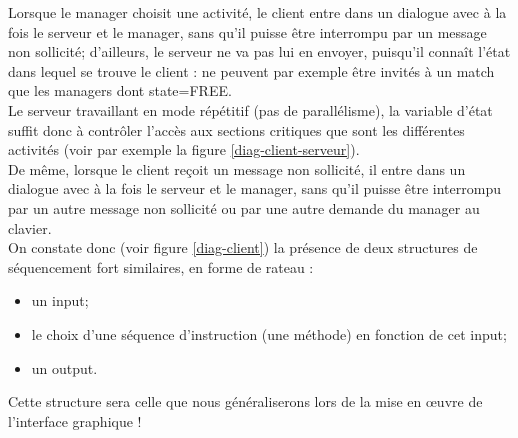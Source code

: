 \documentclass[a4paper,titlepage]{scrreprt}
\begin{document}
 Lorsque le manager choisit une activité, le client entre dans un dialogue avec à la fois le serveur et le manager,
 sans qu'il puisse être interrompu par un message non sollicité; d'ailleurs, le serveur ne va pas lui en envoyer,
 puisqu'il connaît l'état dans lequel se trouve le client :
 ne peuvent par exemple être invités à un match que les managers dont state=FREE.\\
 Le serveur travaillant en mode répétitif (pas de parallélisme), la variable d'état suffit donc à contrôler l'accès
 aux sections critiques que sont les différentes activités (voir par exemple la figure \ref{diag-client-serveur}).\\
 De même, lorsque le client reçoit un message non sollicité, il entre dans un dialogue avec à la fois le serveur et le manager,
 sans qu'il puisse être interrompu par un autre message non sollicité ou par une autre demande du manager au clavier.\\
 On constate donc (voir figure \ref{diag-client}) la présence de deux structures de séquencement fort similaires, en forme de rateau :
 \begin{itemize}
   \item un input;
   \item le choix d'une séquence d'instruction (une méthode) en fonction de cet input;
   \item un output.
 \end{itemize}
 Cette structure sera celle que nous généraliserons lors de la mise en \oe uvre de l'interface graphique !
\end{document}
